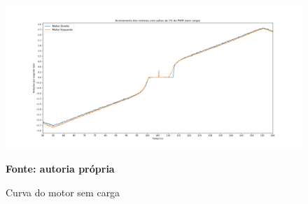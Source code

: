 \begin{figure}[!ht]
\centering
\caption{Curva do motor sem carga}
\label{fig:acionamento1}
		\centering
		\includegraphics[trim={4.4cm 1cm 4.5cm 2cm},clip,
scale=0.38]{Figuras/Acionamento_Sem_Carga_rps}
	
	\textbf{Fonte: autoria própria}
\end{figure}